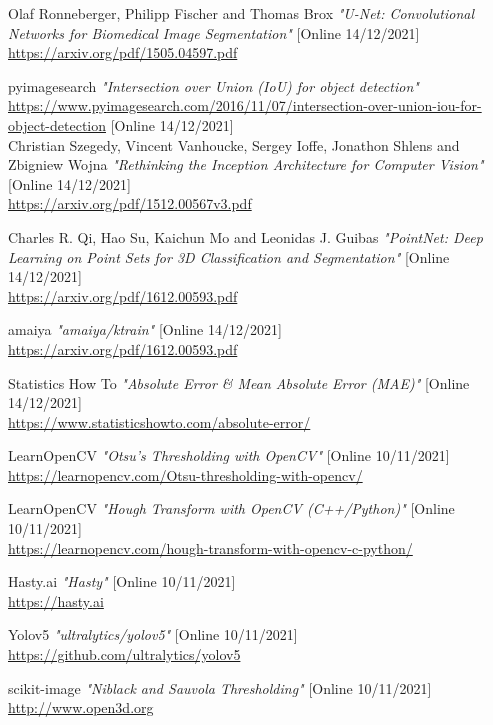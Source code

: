 ﻿\documentclass[10pt,a4paper,twocolumn,twoside]{article}
\begin{document}
\begin{thebibliography}{11}
    Olaf Ronneberger, Philipp Fischer and Thomas Brox \emph{"U-Net: Convolutional Networks for Biomedical Image Segmentation"} [Online 14/12/2021] \\
    \url{https://arxiv.org/pdf/1505.04597.pdf}
    
   pyimagesearch \emph{"Intersection over Union (IoU) for object detection"} \url{https://www.pyimagesearch.com/2016/11/07/intersection-over-union-iou-for-object-detection}
    [Online 14/12/2021] \\
    
    Christian Szegedy, Vincent Vanhoucke, Sergey Ioffe, Jonathon Shlens and Zbigniew Wojna \emph{"Rethinking the Inception Architecture for Computer Vision"} [Online 14/12/2021] \\
    \url{https://arxiv.org/pdf/1512.00567v3.pdf}
    
    Charles R. Qi, Hao Su, Kaichun Mo and Leonidas J. Guibas \emph{"PointNet: Deep Learning on Point Sets for 3D Classification and Segmentation"} [Online 14/12/2021] \\
    \url{https://arxiv.org/pdf/1612.00593.pdf}
    
    amaiya \emph{"amaiya/ktrain"} [Online 14/12/2021] \\
    \url{https://arxiv.org/pdf/1612.00593.pdf}


    Statistics How To \emph{"Absolute Error \& Mean Absolute Error (MAE)"} [Online 14/12/2021] \\
    \url{https://www.statisticshowto.com/absolute-error/}
    
    LearnOpenCV \emph{"Otsu’s Thresholding with OpenCV"} [Online 10/11/2021] \\
    \url{https://learnopencv.com/Otsu-thresholding-with-opencv/}

    LearnOpenCV \emph{"Hough Transform with OpenCV (C++/Python)"} [Online 10/11/2021] \\
    \url{https://learnopencv.com/hough-transform-with-opencv-c-python/}

    Hasty.ai \emph{"Hasty"} [Online 10/11/2021] \\
    \url{https://hasty.ai}

    Yolov5 \emph{"ultralytics/yolov5"} [Online 10/11/2021] \\
    \url{https://github.com/ultralytics/yolov5}

    scikit-image \emph{"Niblack and Sauvola Thresholding"} [Online 10/11/2021] \\
    \url{http://www.open3d.org}



\end{thebibliography}
\end{document}
